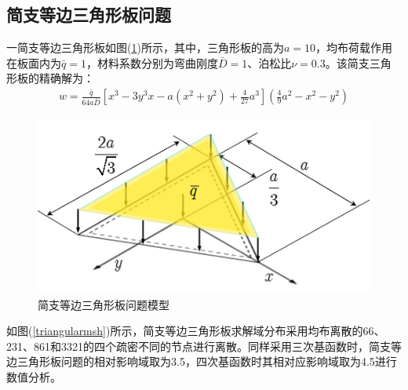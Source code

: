 \subsection{简支等边三角形板问题}
一简支等边三角形板如图(\ref{triangular})所示，其中，三角形板的高为$a=10$，均布荷载作用在板面内为$\bar{q}=1$，材料系数分别为弯曲刚度$\bar{D}=1$、泊松比$\nu=0.3$。该简支三角形板的精确解为：
\begin{equation}
\begin{split}
    w=\frac{\bar q}{64a\bar D}[x^3-3y^3x-a(x^2+y^2)+\frac{4}{27}a^3](\frac{4}{9}a^2-x^2-y^2)
\end{split}
\end{equation}
\begin{figure}[!h]
    \centering
    \includegraphics[scale=0.7]{figure/P/T/triangular.png}
    \caption{简支等边三角形板问题模型}\label{triangular}
\end{figure}\par
如图(\ref{triangularmsh})所示，简支等边三角形板求解域分布采用均布离散的66、231、861和3321的四个疏密不同的节点进行离散。同样采用三次基函数时，简支等边三角形板问题的相对影响域取为3.5，四次基函数时其相对应影响域取为4.5进行数值分析。\par
